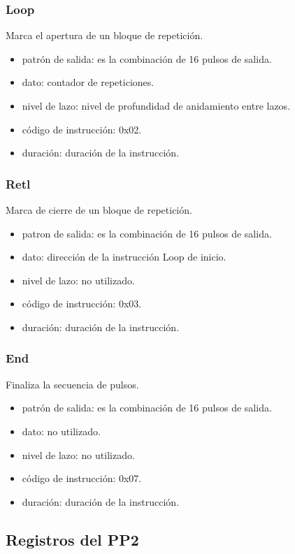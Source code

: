 \subsubsection{Loop}
Marca el apertura de un bloque de repetici\'on.
\begin{itemize}
    \item patr\'on de salida: es la combinaci\'on de 16 pulsos de salida.
    \item dato: contador de repeticiones.
    \item nivel de lazo: nivel de profundidad de anidamiento entre lazos.
    \item c\'odigo de instrucci\'on: 0x02.
    \item duraci\'on: duraci\'on de la instrucci\'on.
\end{itemize}

\subsubsection{Retl}
Marca de cierre de un bloque de repetici\'on.
\begin{itemize}
    \item patron de salida: es la combinaci\'on de 16 pulsos de salida.
    \item dato: direcci\'on de la instrucci\'on Loop de inicio.
    \item nivel de lazo: no utilizado.
    \item c\'odigo de instrucci\'on: 0x03.
    \item duraci\'on: duraci\'on de la instrucci\'on.
\end{itemize}

\subsubsection{End}
Finaliza la secuencia de pulsos.
\begin{itemize}
    \item patr\'on de salida: es la combinaci\'on de 16 pulsos de salida.
    \item dato: no utilizado.
    \item nivel de lazo: no utilizado.
    \item c\'odigo de instrucci\'on: 0x07.
    \item duraci\'on: duraci\'on de la instrucci\'on.
\end{itemize}

\subsection{Registros del PP2}

